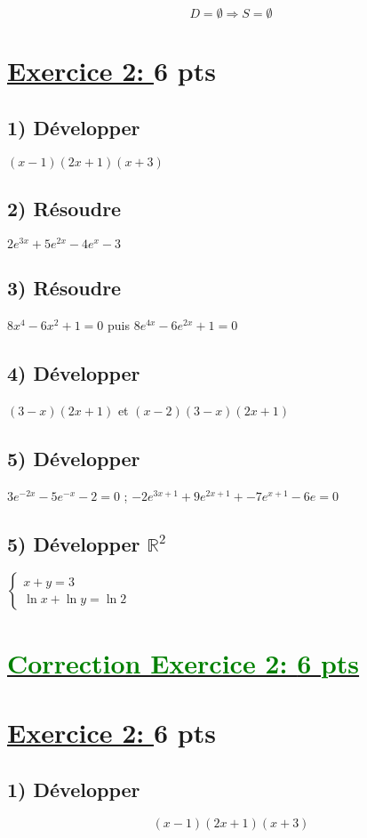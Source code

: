 \documentclass[12pt]{article}
\begin{document}
\[
D = \emptyset \Longrightarrow S = \emptyset
\]

\section*{\underline{Exercice 2: }\textbf{6 pts}}
\subsection*{ 1) Développer } $(x-1)(2x+1)(x+3)$
\subsection*{ 2) Résoudre } $2e^{3x}+5e^{2x}-4e^{x}-3$
\subsection*{ 3) Résoudre } $8x^{4}-6x^{2}+1=0$ puis $8e^{4x}-6e^{2x}+1=0$
\subsection*{ 4) Développer } $(3-x)(2x+1)$ et $(x-2)(3-x)(2x+1)$
\subsection*{ 5) Développer } $3e^{-2x}-5e^{-x}-2=0$ ; $-2e^{3x+1}+9e^{2x+1}+-7e^{x+1}-6e=0$
\subsection*{ 5) Développer $\mathbb{R}^{2}$} 
\( \begin{cases}
x + y = 3 \\
\ln x + \ln y = \ln 2
\end{cases}\)
\section*{\underline{\textcolor{green}{Correction Exercice 2: \textbf{6 pts}}}}

\section*{\underline{Exercice 2: }\textbf{6 pts}}

\subsection*{1) Développer } 
\[
(x-1)(2x+1)(x+3)
\]
\end{document}
